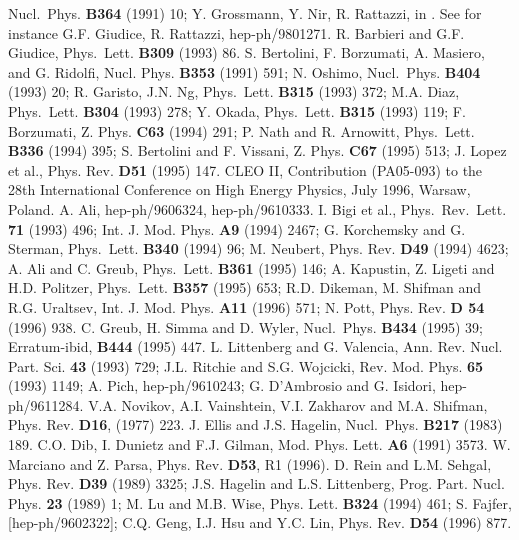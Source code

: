 \begin{thebibliography}{999}
{ Nucl.~Phys.} {\bf B364} (1991) 10;
  Y. Grossmann, Y. Nir, R. Rattazzi, in \cite{HFII}.
See for instance G.F. Giudice, R. Rattazzi, hep-ph/9801271.
 R. Barbieri and G.F. Giudice, 
{ Phys.~Lett.} {\bf B309} (1993) 86.
 S. Bertolini, F. Borzumati, A. Masiero, and G. Ridolfi, 
{ Nucl. Phys.} {\bf B353} (1991) 591;
N. Oshimo, { Nucl.~Phys.} {\bf B404} (1993) 20; 
R. Garisto, J.N. Ng, { Phys.~Lett.} {\bf B315} (1993) 372; 
M.A. Diaz, { Phys.~Lett.} {\bf B304} (1993) 278; 
Y. Okada, { Phys.~Lett.} {\bf B315} (1993) 119; 
F. Borzumati, { Z. Phys.} {\bf C63} (1994) 291; 
P. Nath and R. Arnowitt, { Phys.~Lett.} {\bf B336} (1994) 395; 
S. Bertolini and F. Vissani, { Z. Phys.} {\bf C67} (1995) 513; 
J. Lopez et al., { Phys. Rev.} {\bf D51} (1995) 147. 
CLEO II, Contribution (PA05-093) to the 28th International Conference
on High Energy Physics, July 1996, Warsaw, Poland.
{ A. Ali}, hep-ph/9606324, hep-ph/9610333.
{ I. Bigi et al.,} { Phys.~Rev.~Lett.} {\bf 71} (1993) 496;
{ Int. J. Mod. Phys.} {\bf A9} (1994) 2467;
{ G. Korchemsky and G. Sterman,} { Phys.~Lett.} {\bf B340} (1994) 96;
{ M. Neubert}, { Phys. Rev.} {\bf D49} (1994) 4623;
{ A. Ali and C. Greub}, { Phys.~Lett.} {\bf B361} (1995) 146;
{ A. Kapustin, Z. Ligeti and H.D. Politzer,}
{ Phys.~Lett.} {\bf B357} (1995) 653;
{ R.D. Dikeman, M. Shifman and R.G. Uraltsev},
{ Int. J. Mod. Phys.} {\bf A11} (1996) 571;
{ N. Pott,} { Phys. Rev.} {\bf D 54} (1996) 938.
{ C. Greub, H. Simma and D. Wyler},
{ Nucl.~Phys.} {\bf B434} (1995) 39; Erratum-ibid,
{\bf B444} (1995) 447.
{ L. Littenberg and G. Valencia,}
{ Ann. Rev. Nucl. Part. Sci.} {\bf 43} (1993) 729;
{ J.L. Ritchie and S.G. Wojcicki,} { Rev. Mod. Phys.} {\bf 65} (1993)
1149; A. Pich, hep-ph/9610243; G. D'Ambrosio and G. Isidori,
hep-ph/9611284.
{ V.A. Novikov, A.I. Vainshtein, V.I. Zakharov and M.A. Shifman,}
Phys. Rev. {\bf D16}, (1977) 223.
{ J. Ellis and J.S. Hagelin,} { Nucl.~Phys.} {\bf B217} (1983) 189.
{ C.O. Dib, I. Dunietz and F.J. Gilman,} { Mod. Phys. Lett.}
{\bf A6} (1991) 3573.
{ W. Marciano and Z. Parsa}, Phys. Rev. {\bf D53}, R1 (1996).
{ D. Rein and L.M. Sehgal,} { Phys. Rev.} {\bf D39} (1989) 3325;
{ J.S. Hagelin and L.S. Littenberg,} { Prog. Part. Nucl. Phys.}
{\bf 23} (1989) 1;
{ M. Lu and M.B. Wise,} { Phys. Lett.} {\bf B324} (1994) 461;
{ S. Fajfer}, [hep-ph/9602322]; { C.Q. Geng, I.J. Hsu and Y.C. Lin},
{ Phys. Rev.} {\bf D54} (1996) 877.

\end{thebibliography}
